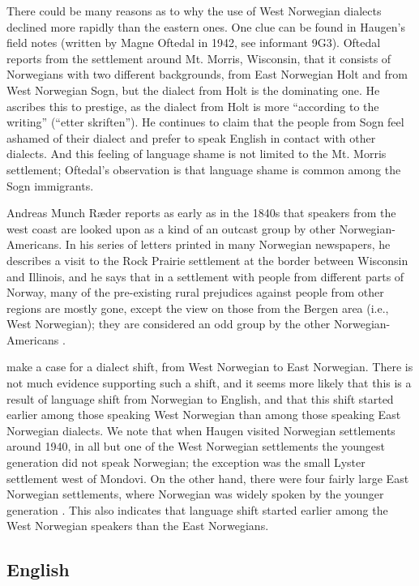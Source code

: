 \documentclass[output=paper]{langscibook}
\begin{document}
There could be many reasons as to why the use of West Norwegian dialects declined more rapidly than the eastern ones. One clue can be found in  Haugen’s field notes (written by Magne Oftedal in 1942, see informant 9G3). Oftedal reports from the settlement around Mt. Morris, Wisconsin, that it consists of Norwegians with two different backgrounds, from East Norwegian Holt and from West Norwegian Sogn, but the dialect from Holt is the dominating one. He ascribes this to prestige, as the dialect from Holt is more “according to the writing” (“etter skriften”). He continues to claim that the people from Sogn feel ashamed of their dialect and prefer to speak English in contact with other dialects. And this feeling of language shame is not limited to the Mt. Morris settlement; Oftedal’s observation is that language shame is common among the Sogn immigrants. 

Andreas Munch Ræder reports as early as in the 1840s that speakers from the west coast are looked upon as a kind of an outcast group by other Norwegian\hyp Americans. In his series of letters printed in many Norwegian newspapers, he describes a visit to the Rock Prairie settlement at the border between Wisconsin and Illinois, and he says that in a settlement with people from different parts of Norway, many of the pre-existing rural prejudices against people from other regions are mostly gone, except the view on those from the Bergen area (i.e., West Norwegian); they are considered an odd group by the other Norwegian\hyp Americans \citep{Ræder1848}.

\citet{JohannessenLaake2012} make a case for a dialect shift, from West Norwegian to East Norwegian. There is not much evidence supporting such a shift, and it seems more likely that this is a result of language shift from Norwegian to English, and that this shift started earlier among those speaking West Norwegian than among those speaking East Norwegian dialects. We note that when Haugen visited Norwegian settlements around 1940, in all but one of the West Norwegian settlements the youngest generation did not speak Norwegian; the exception was the small Lyster settlement west of Mondovi. On the other hand, there were four fairly large East Norwegian settlements, where Norwegian was widely spoken by the younger generation \citep[606--615]{Haugen1953}. This also indicates that language shift started earlier among the West Norwegian speakers than the East Norwegians. 

\subsection{English}\label{sec:hjelde:7.2}
\end{document}
